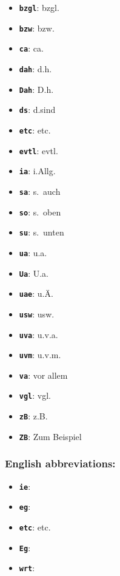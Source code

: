 \documentclass[english]{hgbarticle}
\begin{document}
\begin{itemize}
\item \textbf{\texttt{{\bs}bzgl}}: bzgl.
\item \textbf{\texttt{{\bs}bzw}}: bzw.
\item \textbf{\texttt{{\bs}ca}}: ca.
\item \textbf{\texttt{{\bs}dah}}: d.\thinspace{}h.
\item \textbf{\texttt{{\bs}Dah}}: D.\thinspace{}h.
\item \textbf{\texttt{{\bs}ds}}: d.\thinspace{}sind
\item \textbf{\texttt{{\bs}etc}}: etc.
\item \textbf{\texttt{{\bs}evtl}}: evtl.
\item \textbf{\texttt{{\bs}ia}}: i.\thinspace{}Allg.
\item \textbf{\texttt{{\bs}sa}}: s.\ auch
\item \textbf{\texttt{{\bs}so}}: s.\ oben
\item \textbf{\texttt{{\bs}su}}: s.\ unten
\item \textbf{\texttt{{\bs}ua}}: u.\thinspace{}a.
\item \textbf{\texttt{{\bs}Ua}}: U.\thinspace{}a.
\item \textbf{\texttt{{\bs}uae}}: u.\thinspace{}\"A.
\item \textbf{\texttt{{\bs}usw}}: usw.
\item \textbf{\texttt{{\bs}uva}}: u.\thinspace{}v.\thinspace{}a.
\item \textbf{\texttt{{\bs}uvm}}: u.\thinspace{}v.\thinspace{}m.
\item \textbf{\texttt{{\bs}va}}: vor allem
\item \textbf{\texttt{{\bs}vgl}}: vgl.
\item \textbf{\texttt{{\bs}zB}}: z.\thinspace{}B.
\item \textbf{\texttt{{\bs}ZB}}: Zum Beispiel
\end{itemize}

\subsubsection*{English abbreviations:}

\begin{itemize}
\item \textbf{\texttt{{\bs}ie}}: \ie
\item \textbf{\texttt{{\bs}eg}}: \eg
\item \textbf{\texttt{{\bs}etc}}: etc.
\item \textbf{\texttt{{\bs}Eg}}: \Eg
\item \textbf{\texttt{{\bs}wrt}}: \wrt
\end{itemize}
\end{document}
